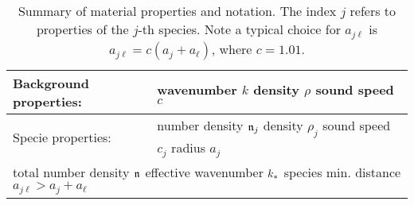 \begin{table}[h]
\centering
\begin{tabular}{|l| l|}
  \hline
Background properties: &  wavenumber $k$ \hspace{0.8cm} density $\rho$  \hspace{0.25cm} sound speed $c$
\\ \hline
Specie properties: & number density $\mathfrak n_{j}$ \hspace{0.1cm} density $\rho_j $
\hspace{0.1cm} sound speed $c_j$  \hspace{0.1cm} radius $a_j$
\\\hline
\multicolumn{2}{|l|}{
  total number density $\mathfrak n_{}$   \hspace{0.2cm}  effective wavenumber $k_*$ \hspace{0.2cm} species min. distance $a_{j\ell} > a_j + a_\ell$
}
\\\hline
\end{tabular}
\label{tab:properties}
\caption{Summary of material properties and notation. The index $j$ refers to properties of the $j$-th species. Note a typical choice for $a_{j\ell}$ is $a_{j\ell} = c (a_j + a_\ell)$, where $c=1.01$.}
\end{table}
